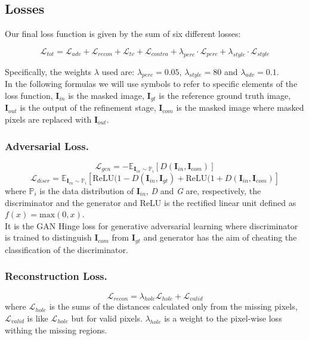 \documentclass[10pt,twocolumn,letterpaper]{article}
\begin{document}
\subsection{Losses}
Our final loss function is given by the sum of six different losses:

\begin{dmath}
      \mathcal{L}_{tot} = \mathcal{L}_{adv} + \mathcal{L}_{recon} +
      \mathcal{L}_{tv} + \mathcal{L}_{contra} + \lambda_{perc} \cdot
      \mathcal{L}_{perc} + \lambda_{style} \cdot \mathcal{L}_{style}
\end{dmath}

Specifically, the weights $\lambda$ used are: $\lambda_{perc} = 0.05$,
$\lambda_{style} = 80$ and $\lambda_{adv} = 0.1$.\\
In the following formulas we will use symbols to refer to specific elements of
the loss function, $\mathbf{I}_{in}$ is the masked image, $\mathbf{I}_{gt}$ is
the reference ground truth image, $\mathbf{I}_{out}$ is the output of the
refinement stage, $\mathbf{I}_{com}$ is the masked image where masked pixels are
replaced with $\mathbf{I}_{out}$. \\

\subsubsection{Adversarial Loss.}
\begin{dmath}
    \mathcal{L}_{gen} = -\mathbb{E}_{\mathbf{I}_{in} \sim \mathbb{P}_i}
    [D(\mathbf{I}_{in},\mathbf{I}_{com})]
\end{dmath}
\begin{dmath}
    \mathcal{L}_{discr} = \mathbb{E}_{\mathbf{I}_{in} \sim \mathbb{P}_i}
    [\mathrm{ReLU}(1-D(\mathbf{I}_{in},\mathbf{I}_{gt}) +
    \mathrm{ReLU}(1+D(\mathbf{I}_{in},\mathbf{I}_{com})]
\end{dmath}
where \(\mathbb{P}_i\) is the data distribution of $\mathbf{I}_{in}$, \textit{D}
and \textit{G} are, respectively, the discriminator and the generator and ReLU
is the rectified linear unit defined as \(f(x) = \mathrm{max}(0,x)\).\\ It is
the GAN Hinge loss for generative adversarial learning where discriminator is
trained to distinguish $\mathbf{I}_{com}$ from $\mathbf{I}_{gt}$ and generator
has the aim of cheating the classification of the discriminator.

\subsubsection{Reconstruction Loss.}
\begin{dmath}
    \mathcal{L}_{recon} = \lambda_{hole} \mathcal{L}_{hole} +
    \mathcal{L}_{valid}
\end{dmath}
where \(\mathcal{L}_{hole}\) is the sums of the distances calculated only from
the missing pixels, \(\mathcal{L}_{valid}\) is like \(\mathcal{L}_{hole}\) but
for valid pixels. \(\lambda_{hole}\) is a weight to the pixel-wise loss withing
the missing regions.
\end{document}
